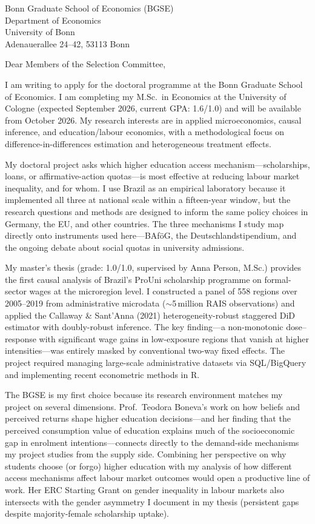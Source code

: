 \documentclass[a4paper,11pt]{letter}
\begin{document}
\begin{letter}{%
    Bonn Graduate School of Economics (BGSE) \\
    Department of Economics \\
    University of Bonn \\
    Adenauerallee 24--42, 53113 Bonn
}

\opening{Dear Members of the Selection Committee,}

I am writing to apply for the doctoral programme at the Bonn Graduate School of Economics. I am completing my M.Sc.\ in Economics at the University of Cologne (expected September 2026, current GPA: 1.6/1.0) and will be available from October 2026. My research interests are in applied microeconomics, causal inference, and education/labour economics, with a methodological focus on difference-in-differences estimation and heterogeneous treatment effects.

My doctoral project asks which higher education access mechanism---scholarships, loans, or affirmative-action quotas---is most effective at reducing labour market inequality, and for whom. I use Brazil as an empirical laboratory because it implemented all three at national scale within a fifteen-year window, but the research questions and methods are designed to inform the same policy choices in Germany, the EU, and other countries. The three mechanisms I study map directly onto instruments used here---BAf\"oG, the Deutschlandstipendium, and the ongoing debate about social quotas in university admissions.

My master's thesis (grade: 1.0/1.0, supervised by Anna Person, M.Sc.) provides the first causal analysis of Brazil's ProUni scholarship programme on formal-sector wages at the microregion level. I constructed a panel of 558 regions over 2005--2019 from administrative microdata ($\sim$5\,million RAIS observations) and applied the Callaway \& Sant'Anna (2021) heterogeneity-robust staggered DiD estimator with doubly-robust inference. The key finding---a non-monotonic dose--response with significant wage gains in low-exposure regions that vanish at higher intensities---was entirely masked by conventional two-way fixed effects. The project required managing large-scale administrative datasets via SQL/BigQuery and implementing recent econometric methods in R.

The BGSE is my first choice because its research environment matches my project on several dimensions. Prof.\ Teodora Boneva's work on how beliefs and perceived returns shape higher education decisions---and her finding that the perceived consumption value of education explains much of the socioeconomic gap in enrolment intentions---connects directly to the demand-side mechanisms my project studies from the supply side. Combining her perspective on why students choose (or forgo) higher education with my analysis of how different access mechanisms affect labour market outcomes would open a productive line of work. Her ERC Starting Grant on gender inequality in labour markets also intersects with the gender asymmetry I document in my thesis (persistent gaps despite majority-female scholarship uptake).


\end{letter}
\end{document}
